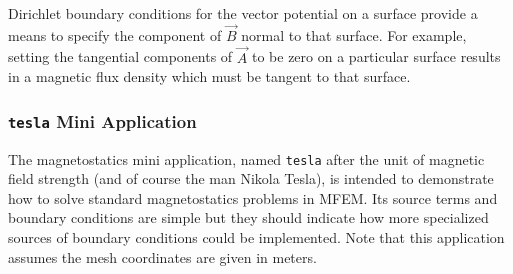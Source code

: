\documentclass{article}
\begin{document}
Dirichlet boundary conditions for the vector potential on a surface
provide a means to specify the component of $\vec{B}$ normal to that
surface.  For example, setting the tangential components of $\vec{A}$
to be zero on a particular surface results in a magnetic flux density
which must be tangent to that surface.

\subsubsection{{\tt tesla} Mini Application}

The magnetostatics mini application, named {\tt tesla} after the unit
of magnetic field strength (and of course the man Nikola Tesla), is
intended to demonstrate how to solve standard magnetostatics problems
in MFEM.  Its source terms and boundary conditions are simple but they
should indicate how more specialized sources of boundary conditions
could be implemented.  Note that this application assumes the mesh
coordinates are given in meters.
\end{document}
